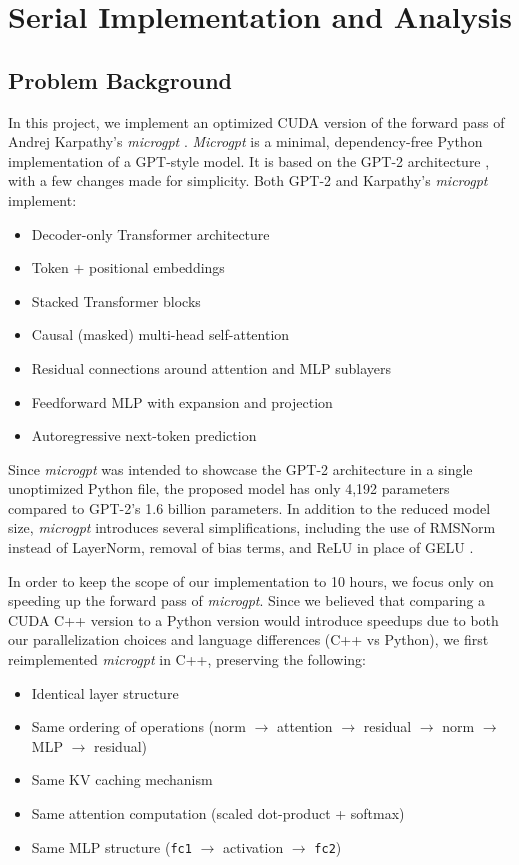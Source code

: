 \section{Serial Implementation and Analysis}

\subsection*{Problem Background}

In this project, we implement an optimized CUDA version of the forward pass of Andrej Karpathy's \textit{microgpt} \cite{karpathyMicrogpt2026}. \textit{Microgpt} is a minimal, dependency-free Python implementation of a GPT-style model. It is based on the GPT-2 architecture \cite{radfordLanguageModelsAre2019}, with a few changes made for simplicity. Both GPT-2 and Karpathy's \textit{microgpt} implement:
\begin{itemize}[noitemsep, topsep=0pt]
  \item Decoder-only Transformer architecture
  \item Token + positional embeddings
  \item Stacked Transformer blocks
  \item Causal (masked) multi-head self-attention
  \item Residual connections around attention and MLP sublayers
  \item Feedforward MLP with expansion and projection
  \item Autoregressive next-token prediction
\end{itemize}
Since \textit{microgpt} was intended to showcase the GPT-2 architecture in a single unoptimized Python file, the proposed model has only 4,192 parameters compared to GPT-2's 1.6 billion parameters. In addition to the reduced model size, \textit{microgpt} introduces several simplifications, including the use of RMSNorm instead of LayerNorm, removal of bias terms, and ReLU in place of GELU \cite{karpathyMicrogpt2026}. 

\noindent In order to keep the scope of our implementation to 10 hours, we focus only on speeding up the forward pass of \textit{microgpt}. Since we believed that comparing a CUDA C++ version to a Python version would introduce speedups due to both our parallelization choices and language differences (C++ vs Python), we first reimplemented \textit{microgpt} in C++, preserving the following:
\begin{itemize}[noitemsep, topsep=0pt]  \item Identical layer structure
  \item Same ordering of operations (norm $\rightarrow$ attention $\rightarrow$ residual $\rightarrow$ norm $\rightarrow$ MLP $\rightarrow$ residual)
  \item Same KV caching mechanism
  \item Same attention computation (scaled dot-product + softmax)
  \item Same MLP structure (\texttt{fc1} $\rightarrow$ activation $\rightarrow$ \texttt{fc2})
\end{itemize}

